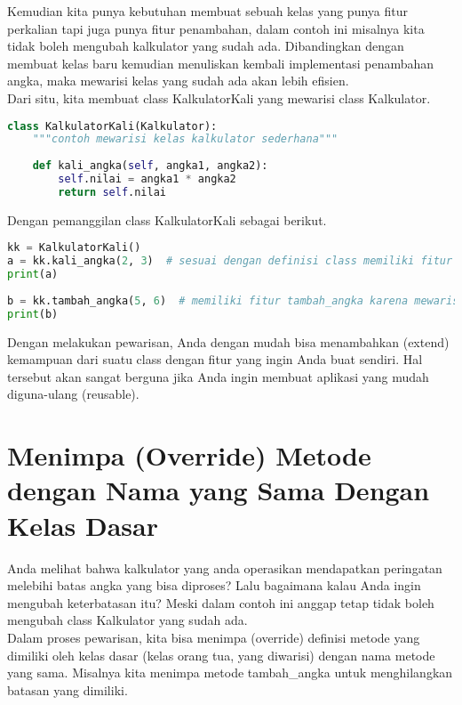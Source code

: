 Kemudian kita punya kebutuhan membuat sebuah kelas yang punya fitur perkalian tapi juga punya fitur penambahan, dalam contoh ini misalnya kita tidak boleh mengubah kalkulator yang sudah ada. Dibandingkan dengan membuat kelas baru kemudian menuliskan kembali implementasi penambahan angka, maka mewarisi kelas yang sudah ada akan lebih efisien.\\

Dari situ, kita membuat class KalkulatorKali yang mewarisi class Kalkulator.

\begin{lstlisting}[language=Python]
class KalkulatorKali(Kalkulator):
    """contoh mewarisi kelas kalkulator sederhana"""
 
    def kali_angka(self, angka1, angka2):
        self.nilai = angka1 * angka2
        return self.nilai
\end{lstlisting}

Dengan pemanggilan class KalkulatorKali sebagai berikut.

\begin{lstlisting}[language=Python]
kk = KalkulatorKali()
a = kk.kali_angka(2, 3)  # sesuai dengan definisi class memiliki fitur kali_angka
print(a)
 
b = kk.tambah_angka(5, 6)  # memiliki fitur tambah_angka karena mewarisi dari Kalkulator
print(b)
\end{lstlisting}

Dengan melakukan pewarisan, Anda dengan mudah bisa menambahkan (extend) kemampuan dari suatu class dengan fitur yang ingin Anda buat sendiri. Hal tersebut akan sangat berguna jika Anda ingin membuat aplikasi yang mudah diguna-ulang (reusable).

\section{Menimpa (Override) Metode dengan Nama yang Sama Dengan Kelas Dasar}

Anda melihat bahwa kalkulator yang anda operasikan mendapatkan peringatan melebihi batas angka yang bisa diproses? Lalu bagaimana kalau Anda ingin mengubah keterbatasan itu? Meski dalam contoh ini anggap tetap tidak boleh mengubah class Kalkulator yang sudah ada.\\

Dalam proses pewarisan, kita bisa menimpa (override) definisi metode yang dimiliki oleh kelas dasar (kelas orang tua, yang diwarisi) dengan nama metode yang sama. Misalnya kita menimpa metode tambah\_angka untuk menghilangkan batasan yang dimiliki.\\

